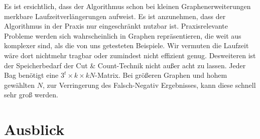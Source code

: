 Es ist ersichtlich, dass der Algorithmus schon bei kleinen Graphenerweiterungen merkbare Laufzeitverlängerungen aufweist. Es ist anzunehmen, dass der Algorithmus in der Praxis nur eingeschränkt nutzbar ist. Praxisrelevante Probleme werden sich wahrscheinlich in Graphen repräsentieren, die weit aus komplexer sind, als die von uns getesteten Beispiele. Wir vermuten die Laufzeit wäre dort nichtmehr tragbar oder zumindest nicht effizient genug. Desweiteren ist der Speicherbedarf der Cut \& Count-Technik nicht außer acht zu lassen. Jeder Bag benötigt eine $3^t\times k\times kN$-Matrix. Bei größeren Graphen und hohem gewählten $N$, zur Verringerung des Falsch-Negativ Ergebnisses, kann diese schnell sehr groß werden.

\section{Ausblick}
\label{sec:outlook}

